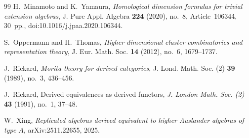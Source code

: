 \documentclass[12pt,a4paper,english,reqno]{amsart}
\theoremstyle{plain}
\theoremstyle{definition}
\begin{document}
\begin{thebibliography}{99}
H.~Minamoto and K.~Yamaura,
\emph{Homological dimension formulas for trivial extension algebras},
J. Pure Appl. Algebra \textbf{224} (2020), no.~8, Article~106344, 30~pp.,
doi:10.1016/j.jpaa.2020.106344.

S.~Oppermann and H.~Thomas,
\emph{Higher-dimensional cluster combinatorics and representation theory},
J. Eur. Math. Soc. \textbf{14} (2012), no.~6, 1679--1737.

J.~Rickard,
\emph{Morita theory for derived categories},
J. Lond. Math. Soc. (2) \textbf{39} (1989), no.~3, 436--456.


J.~Rickard,
Derived equivalences as derived functors,
\emph{J. London Math. Soc. (2)}
\textbf{43} (1991), no.~1, 37--48.

W.~Xing,
\emph{Replicated algebras derived equivalent to higher Auslander algebras
of type $A$},
arXiv:2511.22655, 2025.

\end{thebibliography}
\end{document}
